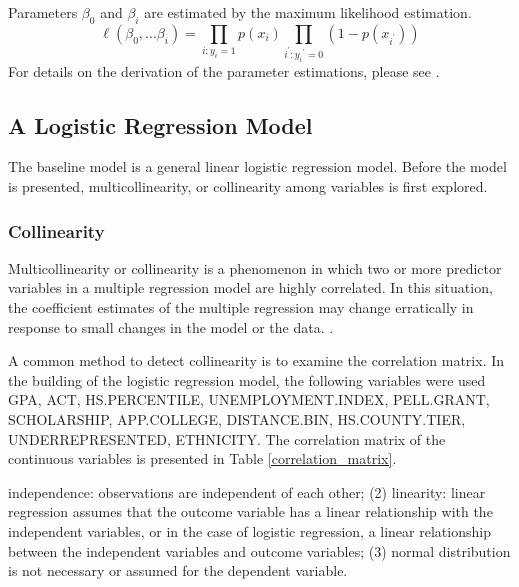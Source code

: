 \documentclass[12pt,english]{report}
\begin{document}

Parameters $\beta_0$ and $\beta_i$ are estimated by the maximum likelihood
estimation.
\begin{equation}
\ell(\beta_0,\ldots \beta_i) = \prod_{i:y_i=1} p(x_i)
\prod_{i^{'}:y_i{^{'}=0}} (1-p(x_{i^{'}}))
\end{equation}
For details on the derivation of the parameter estimations, please see
\citet{Hosmer2013}.

\subsection{A Logistic Regression Model}

The baseline model is a general linear logistic regression model.  Before the
model is presented, multicollinearity, or collinearity among variables is first
explored.

\subsubsection{Collinearity }

Multicollinearity or collinearity is a phenomenon in which two or more predictor variables in a multiple regression model are highly correlated. In
this situation, the coefficient estimates of the multiple regression may change
erratically in response to small changes in the model or the data.
\citep{belsley2005regression,Midi2010}.

A common method to detect collinearity is to examine the correlation matrix.
In the building of the logistic regression model, the following variables were
used GPA, ACT, HS.PERCENTILE, UNEMPLOYMENT.INDEX, PELL.GRANT, SCHOLARSHIP,
APP.COLLEGE, DISTANCE.BIN, HS.COUNTY.TIER, UNDERREPRESENTED, ETHNICITY.  The
correlation matrix of the continuous variables is presented in Table
\ref{correlation_matrix}. 

independence: observations are independent of each other; (2) linearity:
linear regression assumes that the outcome variable has a linear relationship
with the independent variables, or in the case of logistic regression, a linear relationship between the independent variables and outcome
variables; (3) normal distribution is not necessary or assumed for the
dependent variable.
\end{document}
